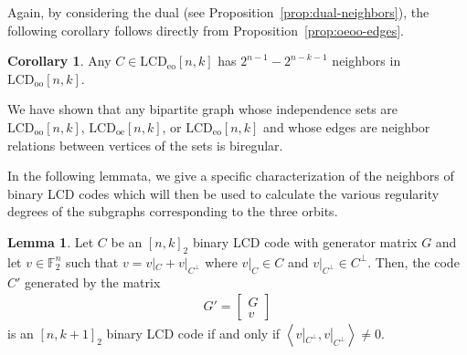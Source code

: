 \documentclass[11pt]{article}
\theoremstyle{definition}
\newtheorem{corollary}[theorem]{Corollary}
\newtheorem{lemma}[theorem]{Lemma}
\newcommand{\F}{\mathbb{F}}
\newcommand{\Ang}[1]{\left\langle#1\right\rangle}
\newcommand{\LCDoo}[2]{\mathrm{LCD}_{\mathrm{oo}} [#1, #2]}
\newcommand{\LCDoe}[2]{\mathrm{LCD}_{\mathrm{oe}} [#1, #2]}
\newcommand{\LCDeo}[2]{\mathrm{LCD}_{\mathrm{eo}} [#1, #2]}
\begin{document}
Again, by considering the dual (see Proposition~\ref{prop:dual-neighbors}), the following corollary follows directly from Proposition~\ref{prop:oeoo-edges}.

\begin{corollary}\label{cor:eooo-edges}
	Any $C \in \LCDeo{n}{k}$ has $2^{n - 1} - 2^{n - k - 1}$ neighbors in $\LCDoo{n}{k}$.
\end{corollary}



We have shown that any bipartite graph whose independence sets are $\LCDoo{n}{k}$, $\LCDoe{n}{k}$, or $\LCDeo{n}{k}$ and whose edges are neighbor relations between vertices of the sets is biregular.

In the following lemmata, we give a specific characterization of the neighbors of binary LCD codes which will then be used to calculate the various regularity degrees of the subgraphs corresponding to the three orbits.

\begin{lemma}\label{lem:augmented-binary}
	Let $C$ be an ${[n, k]}_2$ binary LCD code with generator matrix $G$ and let $v \in \F_2^n$ such that $v = v|_C + v|_{C^{\perp}}$ where $v|_C \in C$ and $v|_{C^{\perp}} \in C^{\perp}$.
	Then, the code $C'$ generated by the matrix
	\begin{align*}
		G' = \begin{bmatrix}
			G \\
			v
		\end{bmatrix}
	\end{align*}
	is an ${[n, k + 1]}_2$ binary LCD code if and only if $\Ang{v|_{C^{\perp}}, v|_{C^{\perp}}} \neq 0$.
\end{lemma}
\end{document}
